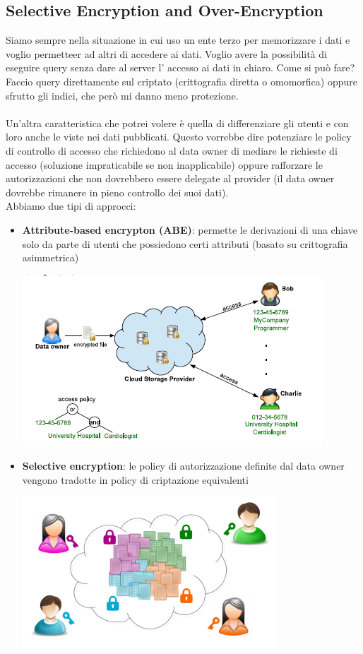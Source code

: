 \subsection{Selective Encryption and Over-Encryption}
Siamo sempre nella situazione in cui uso un ente terzo per memorizzare i dati e voglio permetteer ad altri di accedere ai dati. Voglio avere la possibilità di eseguire query senza dare al server l' accesso ai dati in chiaro. Come si può fare? Faccio query direttamente sul criptato (crittografia diretta o omomorfica) oppure sfrutto gli indici, che però mi danno meno protezione.\\\\
Un'altra caratteristica che potrei volere è quella di differenziare gli utenti e con loro anche le viste nei dati pubblicati. Questo vorrebbe dire potenziare le policy di controllo di accesso che richiedono al data owner di mediare le richieste di accesso (soluzione impraticabile se non inapplicabile) oppure rafforzare le autorizzazioni che non dovrebbero essere delegate al provider (il data owner dovrebbe rimanere in pieno controllo dei suoi dati).\\
Abbiamo due tipi di approcci:
\begin{itemize}
    \item \textbf{Attribute-based encrypton (ABE)}: permette le derivazioni di una chiave solo da parte di utenti che possiedono certi attributi (basato su crittografia asimmetrica)
    \begin{center}
        \includegraphics[scale=0.6]{img/abe.png}
    \end{center}
    
    \item \textbf{Selective encryption}: le policy di autorizzazione definite dal data owner vengono tradotte in policy di criptazione equivalenti 
    \begin{center}
        \includegraphics[scale=0.6]{img/selenc.png}
    \end{center}
\end{itemize}
